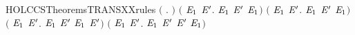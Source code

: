 \begin{SaveVerbatim}{HOLCCSTheoremsTRANSXXrules}
\HOLTokenTurnstile{} \ensuremath{(}\HOLSymConst{\HOLTokenForall{}} . \HOLSymConst{\ensuremath{\ldotp}} \HOLTokenTransBegin{}\HOLTokenTransEnd {}\ensuremath{)} \HOLSymConst{\HOLTokenConj{}} \ensuremath{(}\HOLSymConst{\HOLTokenForall{}}  \ensuremath{\HOLBoundVar{E}\sb{\mathrm{1}}} \ensuremath{\HOLBoundVar{E}\sp{\prime}}.  \HOLTokenTransBegin{}\HOLTokenTransEnd \ensuremath{\HOLBoundVar{E}\sb{\mathrm{1}}} \HOLSymConst{\HOLTokenImp{}}  \HOLSymConst{\ensuremath{+}} \ensuremath{\HOLBoundVar{E}\sp{\prime}} \HOLTokenTransBegin{}\HOLTokenTransEnd \ensuremath{\HOLBoundVar{E}\sb{\mathrm{1}}}\ensuremath{)} \HOLSymConst{\HOLTokenConj{}}
   \ensuremath{(}\HOLSymConst{\HOLTokenForall{}}  \ensuremath{\HOLBoundVar{E}\sb{\mathrm{1}}} \ensuremath{\HOLBoundVar{E}\sp{\prime}}.  \HOLTokenTransBegin{}\HOLTokenTransEnd \ensuremath{\HOLBoundVar{E}\sb{\mathrm{1}}} \HOLSymConst{\HOLTokenImp{}} \ensuremath{\HOLBoundVar{E}\sp{\prime}} \HOLSymConst{\ensuremath{+}}  \HOLTokenTransBegin{}\HOLTokenTransEnd \ensuremath{\HOLBoundVar{E}\sb{\mathrm{1}}}\ensuremath{)} \HOLSymConst{\HOLTokenConj{}}
   \ensuremath{(}\HOLSymConst{\HOLTokenForall{}}  \ensuremath{\HOLBoundVar{E}\sb{\mathrm{1}}} \ensuremath{\HOLBoundVar{E}\sp{\prime}}.  \HOLTokenTransBegin{}\HOLTokenTransEnd \ensuremath{\HOLBoundVar{E}\sb{\mathrm{1}}} \HOLSymConst{\HOLTokenImp{}}  \HOLSymConst{\ensuremath{\mid}} \ensuremath{\HOLBoundVar{E}\sp{\prime}} \HOLTokenTransBegin{}\HOLTokenTransEnd \ensuremath{\HOLBoundVar{E}\sb{\mathrm{1}}} \HOLSymConst{\ensuremath{\mid}} \ensuremath{\HOLBoundVar{E}\sp{\prime}}\ensuremath{)} \HOLSymConst{\HOLTokenConj{}}
   \ensuremath{(}\HOLSymConst{\HOLTokenForall{}}  \ensuremath{\HOLBoundVar{E}\sb{\mathrm{1}}} \ensuremath{\HOLBoundVar{E}\sp{\prime}}.  \HOLTokenTransBegin{}\HOLTokenTransEnd \ensuremath{\HOLBoundVar{E}\sb{\mathrm{1}}} \HOLSymConst{\HOLTokenImp{}} \ensuremath{\HOLBoundVar{E}\sp{\prime}} \HOLSymConst{\ensuremath{\mid}}  \HOLTokenTransBegin{}\HOLTokenTransEnd \ensuremath{\HOLBoundVar{E}\sp{\prime}} \HOLSymConst{\ensuremath{\mid}} \ensuremath{\HOLBoundVar{E}\sb{\mathrm{1}}}\ensuremath{)} \HOLSymConst{\HOLTokenConj{}}

\end{SaveVerbatim}
